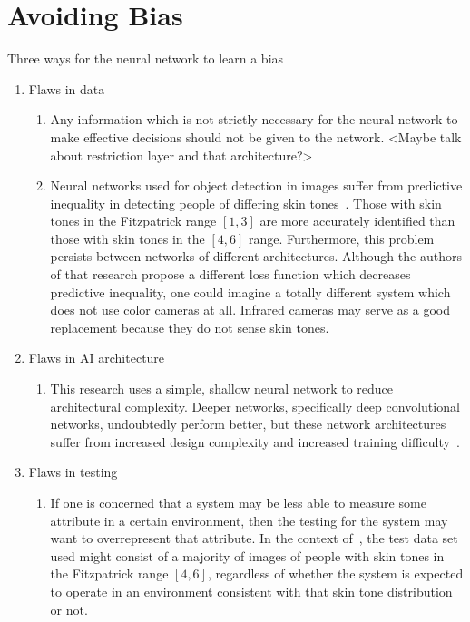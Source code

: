 \documentclass{report}
\begin{document}
\FloatBarrier
\section{Avoiding Bias}

Three ways for the neural network to learn a bias
\begin{enumerate}
    \item Flaws in data
    \begin{enumerate}
        \item Any information which is not strictly necessary for the neural network to make
        effective decisions should not be given to the network. <Maybe talk about restriction layer
        and that architecture?>

        \item Neural networks used for object detection in images suffer from predictive inequality
        in detecting people of differing skin tones~\cite{wilson2019predictive}. Those with skin
        tones in the Fitzpatrick range $[1, 3]$ are more accurately identified than those with skin
        tones in the $[4, 6]$ range. Furthermore, this problem persists between networks of
        different architectures. Although the authors of that research propose a different loss
        function which decreases predictive inequality, one could imagine a totally different system
        which does not use color cameras at all. Infrared cameras may serve as a good replacement
        because they do not sense skin tones.
    \end{enumerate}
    
    \item Flaws in AI architecture
    \begin{enumerate}
        \item This research uses a simple, shallow neural network to reduce architectural
        complexity. Deeper networks, specifically deep convolutional networks, undoubtedly perform
        better, but these network architectures suffer from increased design complexity and
        increased training difficulty~\cite{mhaskar2016deep}.
    \end{enumerate}
    
    \item Flaws in testing
    \begin{enumerate}
        \item If one is concerned that a system may be less able to measure some attribute in a
        certain environment, then the testing for the system may want to overrepresent that
        attribute. In the context of~\cite{wilson2019predictive}, the test data set used might
        consist of a majority of images of people with skin tones in the Fitzpatrick range $[4, 6]$,
        regardless of whether the system is expected to operate in an environment consistent with
        that skin tone distribution or not.


\end{enumerate}
\end{enumerate}
\end{document}
